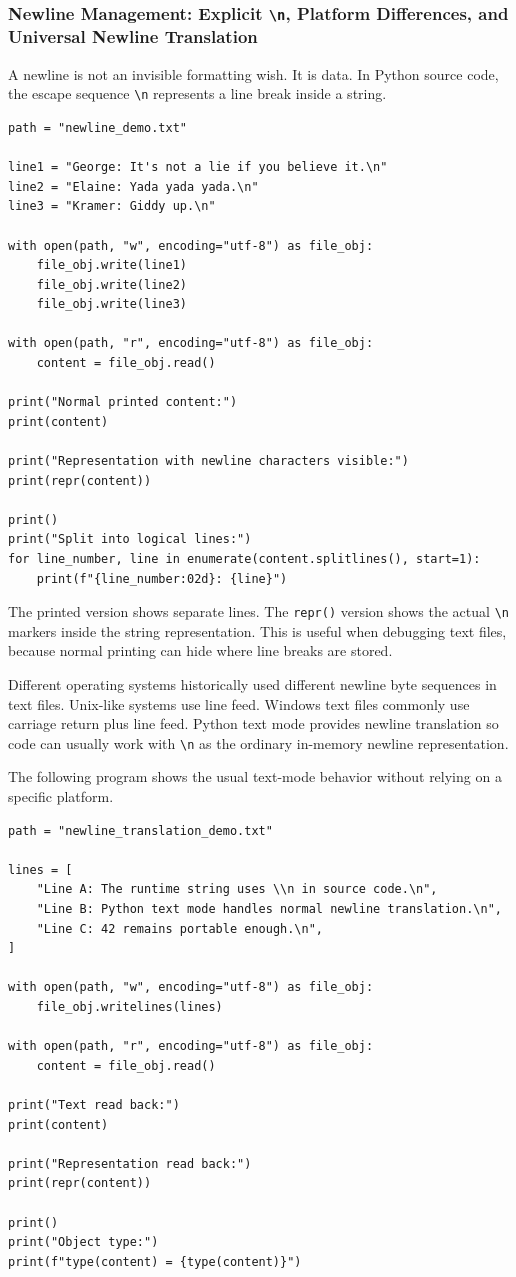 \subsubsection{Newline Management: Explicit \texttt{\textbackslash n}, Platform Differences, and Universal Newline Translation}

A newline is not an invisible formatting wish. It is data. In Python source code, the escape sequence \texttt{\textbackslash n} represents a line break inside a string.

\begin{verbatim}
path = "newline_demo.txt"

line1 = "George: It's not a lie if you believe it.\n"
line2 = "Elaine: Yada yada yada.\n"
line3 = "Kramer: Giddy up.\n"

with open(path, "w", encoding="utf-8") as file_obj:
    file_obj.write(line1)
    file_obj.write(line2)
    file_obj.write(line3)

with open(path, "r", encoding="utf-8") as file_obj:
    content = file_obj.read()

print("Normal printed content:")
print(content)

print("Representation with newline characters visible:")
print(repr(content))

print()
print("Split into logical lines:")
for line_number, line in enumerate(content.splitlines(), start=1):
    print(f"{line_number:02d}: {line}")
\end{verbatim}

The printed version shows separate lines. The \texttt{repr()} version shows the actual \texttt{\textbackslash n} markers inside the string representation. This is useful when debugging text files, because normal printing can hide where line breaks are stored.

Different operating systems historically used different newline byte sequences in text files. Unix-like systems use line feed. Windows text files commonly use carriage return plus line feed. Python text mode provides newline translation so code can usually work with \texttt{\textbackslash n} as the ordinary in-memory newline representation.

The following program shows the usual text-mode behavior without relying on a specific platform.

\begin{verbatim}
path = "newline_translation_demo.txt"

lines = [
    "Line A: The runtime string uses \\n in source code.\n",
    "Line B: Python text mode handles normal newline translation.\n",
    "Line C: 42 remains portable enough.\n",
]

with open(path, "w", encoding="utf-8") as file_obj:
    file_obj.writelines(lines)

with open(path, "r", encoding="utf-8") as file_obj:
    content = file_obj.read()

print("Text read back:")
print(content)

print("Representation read back:")
print(repr(content))

print()
print("Object type:")
print(f"type(content) = {type(content)}")
\end{verbatim}

